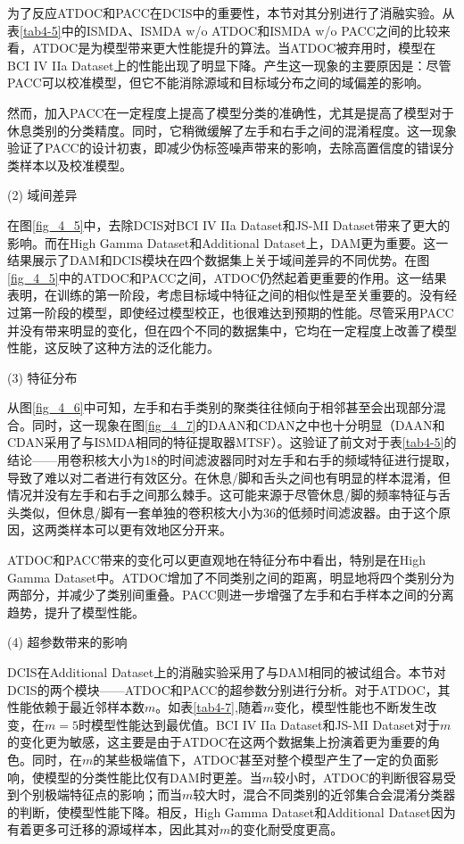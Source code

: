 为了反应ATDOC和PACC在DCIS中的重要性，本节对其分别进行了消融实验。从表\ref{tab4-5}中的ISMDA、ISMDA w/o ATDOC和ISMDA w/o PACC之间的比较来看，ATDOC是为模型带来更大性能提升的算法。当ATDOC被弃用时，模型在BCI IV IIa Dataset上的性能出现了明显下降。产生这一现象的主要原因是：尽管PACC可以校准模型，但它不能消除源域和目标域分布之间的域偏差的影响。

然而，加入PACC在一定程度上提高了模型分类的准确性，尤其是提高了模型对于休息类别的分类精度。同时，它稍微缓解了左手和右手之间的混淆程度。这一现象验证了PACC的设计初衷，即减少伪标签噪声带来的影响，去除高置信度的错误分类样本以及校准模型。

(2) 域间差异

在图\ref{fig_4_5}中，去除DCIS对BCI IV IIa Dataset和JS-MI Dataset带来了更大的影响。而在High Gamma Dataset和Additional Dataset上，DAM更为重要。这一结果展示了DAM和DCIS模块在四个数据集上关于域间差异的不同优势。在图\ref{fig_4_5}中的ATDOC和PACC之间，ATDOC仍然起着更重要的作用。这一结果表明，在训练的第一阶段，考虑目标域中特征之间的相似性是至关重要的。没有经过第一阶段的模型，即使经过模型校正，也很难达到预期的性能。尽管采用PACC并没有带来明显的变化，但在四个不同的数据集中，它均在一定程度上改善了模型性能，这反映了这种方法的泛化能力。

(3) 特征分布

从图\ref{fig_4_6}中可知，左手和右手类别的聚类往往倾向于相邻甚至会出现部分混合。同时，这一现象在图\ref{fig_4_7}的DAAN和CDAN之中也十分明显（DAAN和CDAN采用了与ISMDA相同的特征提取器MTSF）。这验证了前文对于表\ref{tab4-5}的结论——用卷积核大小为18的时间滤波器同时对左手和右手的频域特征进行提取，导致了难以对二者进行有效区分。在休息/脚和舌头之间也有明显的样本混淆，但情况并没有左手和右手之间那么棘手。这可能来源于尽管休息/脚的频率特征与舌头类似，但休息/脚有一套单独的卷积核大小为36的低频时间滤波器。由于这个原因，这两类样本可以更有效地区分开来。

ATDOC和PACC带来的变化可以更直观地在特征分布中看出，特别是在High Gamma Dataset中。ATDOC增加了不同类别之间的距离，明显地将四个类别分为两部分，并减少了类别间重叠。PACC则进一步增强了左手和右手样本之间的分离趋势，提升了模型性能。

(4) 超参数带来的影响

DCIS在Additional Dataset上的消融实验采用了与DAM相同的被试组合。本节对DCIS的两个模块——ATDOC和PACC的超参数分别进行分析。对于ATDOC，其性能依赖于最近邻样本数$m$。如表\ref{tab4-7},随着$m$变化，模型性能也不断发生改变，在$m=5$时模型性能达到最优值。BCI IV IIa Dataset和JS-MI Dataset对于$m$的变化更为敏感，这主要是由于ATDOC在这两个数据集上扮演着更为重要的角色。同时，在$m$的某些极端值下，ATDOC甚至对整个模型产生了一定的负面影响，使模型的分类性能比仅有DAM时更差。当$m$较小时，ATDOC的判断很容易受到个别极端特征点的影响；而当$m$较大时，混合不同类别的近邻集合会混淆分类器的判断，使模型性能下降。相反，High Gamma Dataset和Additional Dataset因为有着更多可迁移的源域样本，因此其对$m$的变化耐受度更高。

